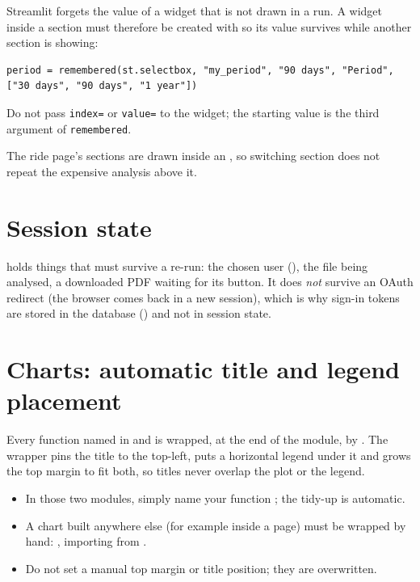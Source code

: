 Streamlit forgets the value of a widget that is not drawn in a run. A widget inside a section must therefore be
created with  so its value survives while another section is showing:

\begin{lstlisting}
period = remembered(st.selectbox, "my_period", "90 days", "Period", ["30 days", "90 days", "1 year"])
\end{lstlisting}

Do not pass \texttt{index=} or \texttt{value=} to the widget; the starting value is the third argument of
\texttt{remembered}.

The ride page's sections are drawn inside an , so switching section does not repeat the expensive
analysis above it.

\section{Session state}

 holds things that must survive a re-run: the chosen user (),
the file being analysed, a downloaded PDF waiting for its button. It does \emph{not} survive an OAuth redirect (the
browser comes back in a new session), which is why sign-in tokens are stored in the database
() and not in session state.

\section{Charts: automatic title and legend placement}\label{sec:figstyle}

Every function named  in  and  is wrapped, at the end of the
module, by . The wrapper pins the title to the top-left, puts a horizontal legend
under it and grows the top margin to fit both, so titles never overlap the plot or the legend.

\begin{itemize}
\item In those two modules, simply name your function ; the tidy-up is automatic.
\item A chart built anywhere else (for example inside a page) must be wrapped by hand:
  , importing  from .
\item Do not set a manual top margin or title position; they are overwritten.
\end{itemize}

